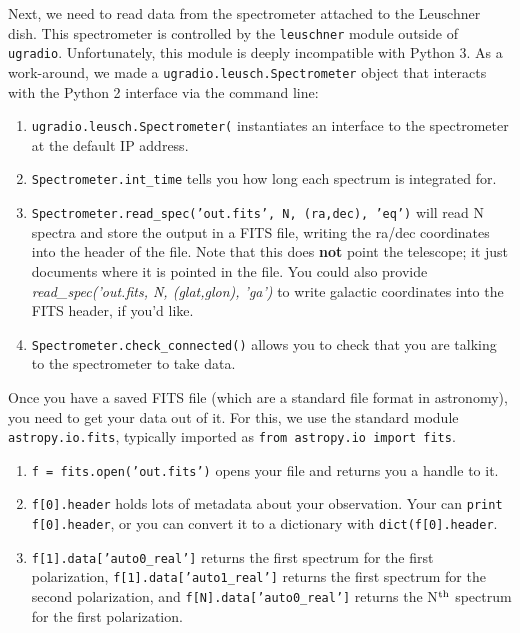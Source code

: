 \documentclass[psfig,preprint]{aastex}
\begin{document}
Next, we need to read data from the spectrometer attached to the Leuschner dish.  This
spectrometer is controlled by the {\tt leuschner} module outside of {\tt ugradio}. Unfortunately, this module is deeply incompatible with Python 3.
As a work-around, we made a {\tt ugradio.leusch.Spectrometer} object that
interacts with the Python 2 interface via the command line:
\begin{enumerate}
\item {\tt ugradio.leusch.Spectrometer(} instantiates an interface to the spectrometer
at the default IP address.
\item {\tt Spectrometer.int\_time} tells you how long each spectrum is integrated for.
\item {\tt Spectrometer.read\_spec('out.fits', N, (ra,dec), 'eq')} will read N spectra and
store the output in a FITS file, writing the ra/dec coordinates into the header of the file.  Note that
this does {\bf not} point the telescope; it just documents where it is pointed in the file.  You
could also provide {\it read\_spec('out.fits, N, (glat,glon), 'ga')} to write galactic coordinates
into the FITS header, if you'd like.
\item {\tt Spectrometer.check\_connected()} allows you to check that you are talking to the spectrometer to take data.
\end{enumerate}

Once you have a saved FITS file (which are a standard file format in astronomy), you need to get your data out of it.  For this,
we use the standard module {\tt astropy.io.fits}, typically imported as
{\tt from astropy.io import fits}.
\begin{enumerate}
\item {\tt f = fits.open('out.fits')} opens your file and returns you a handle to it.
\item {\tt f[0].header} holds lots of metadata about your observation.  Your can {\tt print f[0].header},
or you can convert it to a dictionary with {\tt dict(f[0].header}.
\item {\tt f[1].data['auto0\_real']} returns the first spectrum for the first polarization, {\tt f[1].data['auto1\_real']} returns the first spectrum for the second polarization, and {\tt f[N].data['auto0\_real']} returns the N$^{\rm th}$
spectrum for the first polarization.
\end{enumerate}
\end{document}
